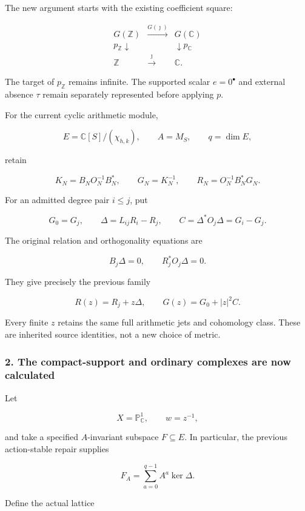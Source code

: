 The new argument starts with the existing coefficient square:

\[
\boxed{
\begin{array}{ccc}
G(\mathbb Z)&\xrightarrow{G(\jmath)}&G(\mathbb C)\\
p_{\mathbb Z}\downarrow&&\downarrow p_{\mathbb C}\\
\mathbb Z&\xrightarrow{\jmath}&\mathbb C.
\end{array}
}
\]

The target of \(p_{\mathbb Z}\) remains infinite. The supported scalar \(e=0^\bullet\) and external absence \(\tau\) remain separately represented before applying \(p\).

For the current cyclic arithmetic module,

\[
E=\mathbb C[S]/(\chi_{h,k}),\qquad A=M_S,\qquad q=\dim E,
\]

retain

\[
K_N=B_NO_N^{-1}B_N^*,\qquad
G_N=K_N^{-1},\qquad
R_N=O_N^{-1}B_N^*G_N.
\]

For an admitted degree pair \(i\le j\), put

\[
G_0=G_j,\qquad
\Delta=L_{ij}R_i-R_j,\qquad
C=\Delta^*O_j\Delta=G_i-G_j.
\]

The original relation and orthogonality equations are

\[
B_j\Delta=0,\qquad R_j^*O_j\Delta=0.
\]

They give precisely the previous family

\[
\boxed{
R(z)=R_j+z\Delta,\qquad
G(z)=G_0+|z|^2C.
}
\]

Every finite \(z\) retains the same full arithmetic jets and cohomology class. These are inherited source identities, not a new choice of metric.

\subsubsection{2. The compact-support and ordinary complexes are now calculated}\label{endpoint-exponential_constituent_original--the-compact-support-and-ordinary-complexes-are-now-calculated}

Let

\[
X=\mathbb P^1_{\mathbb C},\qquad w=z^{-1},
\]

and take a specified \(A\)-invariant subspace \(F\subseteq E\). In particular, the previous action-stable repair supplies

\[
F_A=\sum_{a=0}^{q-1}A^a\ker\Delta.
\]

Define the actual lattice

